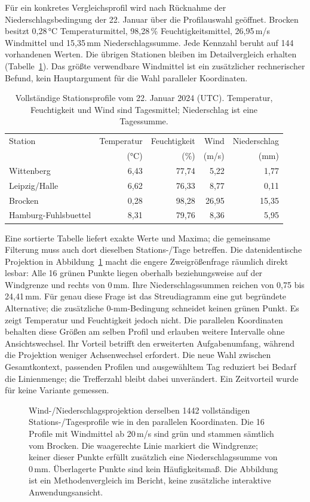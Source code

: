 \documentclass[usegeometry=true]{scrartcl}
\begin{document}
Für ein konkretes Vergleichsprofil wird nach Rücknahme der
Niederschlagsbedingung der 22. Januar über die Profilauswahl geöffnet.
Brocken besitzt 0,28\,°C Temperaturmittel, 98,28\,\% Feuchtigkeitsmittel,
26,95\,m/s Windmittel und 15,35\,mm Niederschlagssumme.
Jede Kennzahl beruht auf 144 vorhandenen Werten. Die übrigen Stationen
bleiben im Detailvergleich erhalten (Tabelle~\ref{tab:windcase}).
Das größte verwendbare Windmittel ist ein zusätzlicher rechnerischer
Befund, kein Hauptargument für die Wahl paralleler Koordinaten.
\begin{table}[htbp]
  \centering
  \small
  \begin{tabular}{lrrrr}
    Station & Temperatur & Feuchtigkeit & Wind & Niederschlag \\
    & (°C) & (\%) & (m/s) & (mm) \\
    \hline
    Wittenberg & 6,43 & 77,74 & 5,22 & 1,77 \\
    Leipzig/Halle & 6,62 & 76,33 & 8,77 & 0,11 \\
    Brocken & 0,28 & 98,28 & 26,95 & 15,35 \\
    Hamburg-Fuhlsbuettel & 8,31 & 79,76 & 8,36 & 5,95 \\
  \end{tabular}
  \caption{Vollständige Stationsprofile vom 22. Januar 2024 (UTC).
  Temperatur, Feuchtigkeit und Wind sind Tagesmittel;
  Niederschlag ist eine Tagessumme.}
  \label{tab:windcase}
\end{table}

Eine sortierte Tabelle liefert exakte Werte und Maxima; die gemeinsame
Filterung muss auch dort dieselben Stations-/Tage betreffen. Die
datenidentische Projektion in Abbildung~\ref{fig:profile-comparison}
macht die engere Zweigrößenfrage räumlich direkt lesbar: Alle 16 grünen
Punkte liegen oberhalb beziehungsweise auf der Windgrenze und rechts
von 0\,mm. Ihre Niederschlagssummen reichen von 0,75 bis 24,41\,mm.
Für genau diese Frage ist das Streudiagramm eine gut begründete
Alternative; die zusätzliche 0-mm-Bedingung schneidet keinen grünen Punkt.
Es zeigt Temperatur und Feuchtigkeit jedoch nicht. Die parallelen
Koordinaten behalten diese Größen am selben Profil und erlauben weitere
Intervalle ohne Ansichtswechsel. Ihr Vorteil betrifft den erweiterten
Aufgabenumfang, während die Projektion weniger Achsenwechsel erfordert.
Die neue Wahl zwischen Gesamtkontext, passenden Profilen und ausgewähltem
Tag reduziert bei Bedarf die Linienmenge; die Trefferzahl bleibt dabei
unverändert. Ein Zeitvorteil wurde für keine Variante gemessen.
\begin{figure}[htbp]
  \centering
  \resizebox{\linewidth}{!}{}
  \caption{Wind-/Niederschlagsprojektion derselben 1442 vollständigen
  Stations-/Tagesprofile wie in den parallelen Koordinaten. Die 16 Profile
  mit Windmittel ab 20\,m/s sind grün und stammen sämtlich vom Brocken.
  Die waagerechte Linie markiert die Windgrenze; keiner dieser Punkte
  erfüllt zusätzlich eine Niederschlagssumme von 0\,mm. Überlagerte Punkte
  sind kein Häufigkeitsmaß. Die Abbildung ist ein Methodenvergleich im
  Bericht, keine zusätzliche interaktive Anwendungsansicht.}
  \label{fig:profile-comparison}
\end{figure}
\end{document}
